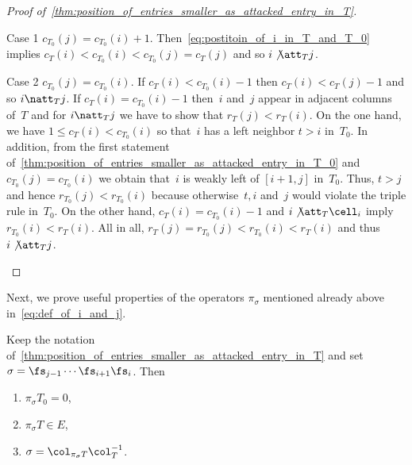 \begin{proof}[Proof of~\cref{thm:position_of_entries_smaller_as_attacked_entry_in_T}]
\begin{enonce*}[remark]{Case 1} $c_{T_0}(j)=c_{T_0}(i)+1$. Then~\eqref{eq:postitoin_of_i_in_T_and_T_0} implies $c_T(i) < c_{T_0}(i)< c_{T_0}(j) = c_T(j)$ and so $i\not \att_T j$. 
\end{enonce*}

\begin{enonce*}[remark]{Case 2} $c_{T_0}(j)=c_{T_0}(i)$. If $c_T(i) < c_{T_0}(i)-1$ then $c_T(i) < c_T(j)-1$ and so $i\natt_T j$. If $c_T(i) = c_{T_0}(i)-1$ then~$i$ and~$j$ appear in adjacent columns of~$T$ and for $i\natt_T j$ we have to show that $r_T(j) < r_T(i)$.
	 On the one hand, we have $1\leq c_T(i) <c_{T_0}(i)$ so that~$i$ has a left neighbor $t>i$ in~$T_0$.
	 In addition, from the first statement of~\cref{thm:position_of_entries_smaller_as_attacked_entry_in_T_0} and $c_{T_0}(j)=c_{T_0}(i)$ we obtain that~$i$ is weakly left of $[i+1,j]$ in~$T_0$.
	 Thus, $t>j$ and hence $r_{T_0}(j) < r_{T_0}(i)$ because otherwise~$t,i$ and~$j$ would violate the triple rule in~$T_0$.
	 On the other hand, $c_T(i) = c_{T_0}(i)-1$ and $i\not \att_T \cell_i$ imply $r_{T_0}(i) < r_T(i)$. All in all, $r_{T}(j) = r_{T_0}(j) < r_{T_0}(i) < r_T(i)$ and thus $i \not \att_T j$.\qedhere
\end{enonce*}
\end{proof}

Next, we prove useful properties of the operators $\pi_\sigma$ mentioned already above in~\eqref{eq:def_of_i_and_j}.

\begin{lemma}
	\label{thm:end:annihilator_for_T_0}
	Keep the notation of~\cref{thm:position_of_entries_smaller_as_attacked_entry_in_T} and set $\sigma = \fs_{j-1} \cdots \fs_{i+1} \fs_i$. Then
	\begin{enumerate}
		\item\label{lemma4.9_1} $\pi_\sigma T_0 = 0$,
		\item\label{lemma4.9_2} $\pi_\sigma T \in E$,
		\item\label{lemma4.9_3} $\sigma = \col_{\pi_\sigma T} \col^{-1}_{T}$.
	\end{enumerate}
\end{lemma}




